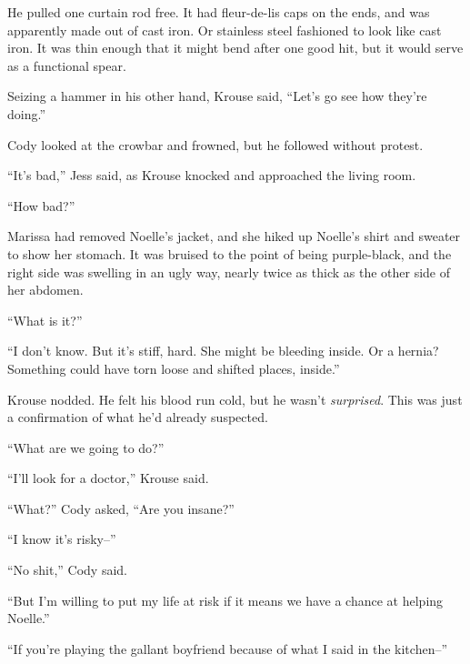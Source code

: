 He pulled one curtain rod free.  It had fleur-de-lis caps on the ends, and was apparently made out of cast iron.  Or stainless steel fashioned to look like cast iron.  It was thin enough that it might bend after one good hit, but it would serve as a functional spear.



Seizing a hammer in his other hand, Krouse said, ``Let's go see how they're doing.''



Cody looked at the crowbar and frowned, but he followed without protest.



``It's bad,'' Jess said, as Krouse knocked and approached the living room.



``How bad?''



Marissa had removed Noelle's jacket, and she hiked up Noelle's shirt and sweater to show her stomach.  It was bruised to the point of being purple-black, and the right side was swelling in an ugly way, nearly twice as thick as the other side of her abdomen.



``What is it?''



``I don't know.  But it's stiff, hard.  She might be bleeding inside.  Or a hernia?  Something could have torn loose and shifted places, inside.''



Krouse nodded.  He felt his blood run cold, but he wasn't \emph{surprised}.  This was just a confirmation of what he'd already suspected.



``What are we going to do?''



``I'll look for a doctor,'' Krouse said.



``What?'' Cody asked, ``Are you insane?''



``I know it's risky--''



``No shit,'' Cody said.



``But I'm willing to put my life at risk if it means we have a chance at helping Noelle.''



``If you're playing the gallant boyfriend because of what I said in the kitchen--''



